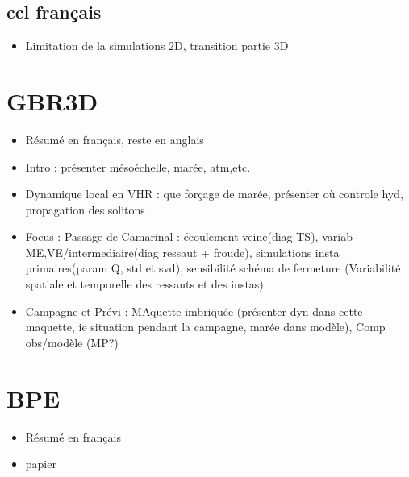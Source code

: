 \documentclass[a4paper,12pt,notitlepage]{report}
\numberwithin{equation}{section}
\begin{document}
%
\addtocounter{section}{1}
%



\section{ccl français}
\begin{itemize}
\item Limitation de la simulations 2D, transition partie 3D
\end{itemize}



\chapter{GBR3D}
\begin{itemize}
\item Résumé en français, reste en anglais
\item Intro : présenter mésoéchelle, marée, atm,etc.
\item Dynamique local en VHR : que forçage de marée, présenter où controle hyd, propagation des solitons
\item Focus : Passage de Camarinal : écoulement veine(diag TS), variab ME,VE/intermediaire(diag ressaut + froude), simulations insta primaires(param Q, std et svd), sensibilité schéma de fermeture  (Variabilité spatiale et temporelle des ressauts et des instas)
\item Campagne et Prévi : MAquette imbriquée (présenter dyn dans cette maquette, ie situation pendant la campagne, marée dans modèle), Comp obs/modèle (MP?)
\end{itemize}







\chapter{BPE}
\begin{itemize}
\item Résumé en français
\item papier
\end{itemize}
\end{document}
